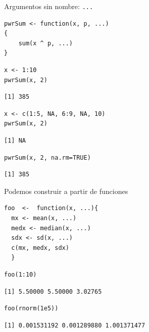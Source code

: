 \documentclass[xcolor={usenames,svgnames,dvipsnames}]{beamer}
\begin{document}
\begin{frame}[fragile,label={sec:org062ccb0}]{Argumentos sin nombre: \texttt{...}}
 \lstset{language=r,label= ,caption= ,captionpos=b,numbers=none}
\begin{lstlisting}
pwrSum <- function(x, p, ...)
{
    sum(x ^ p, ...)
}
\end{lstlisting}

\lstset{language=r,label= ,caption= ,captionpos=b,numbers=none}
\begin{lstlisting}
x <- 1:10
pwrSum(x, 2)
\end{lstlisting}

\begin{verbatim}
[1] 385
\end{verbatim}

\lstset{language=r,label= ,caption= ,captionpos=b,numbers=none}
\begin{lstlisting}
x <- c(1:5, NA, 6:9, NA, 10)
pwrSum(x, 2)
\end{lstlisting}

\begin{verbatim}
[1] NA
\end{verbatim}

\lstset{language=r,label= ,caption= ,captionpos=b,numbers=none}
\begin{lstlisting}
pwrSum(x, 2, na.rm=TRUE)
\end{lstlisting}

\begin{verbatim}
[1] 385
\end{verbatim}
\end{frame}

\begin{frame}[fragile,label={sec:org340ed79}]{Podemos construir a partir de funciones}
 \lstset{language=r,label= ,caption= ,captionpos=b,numbers=none}
\begin{lstlisting}
foo  <-  function(x, ...){
  mx <- mean(x, ...)
  medx <- median(x, ...)
  sdx <- sd(x, ...)
  c(mx, medx, sdx)
  }
\end{lstlisting}

\lstset{language=r,label= ,caption= ,captionpos=b,numbers=none}
\begin{lstlisting}
foo(1:10)
\end{lstlisting}

\begin{verbatim}
[1] 5.50000 5.50000 3.02765
\end{verbatim}

\lstset{language=r,label= ,caption= ,captionpos=b,numbers=none}
\begin{lstlisting}
foo(rnorm(1e5))
\end{lstlisting}

\begin{verbatim}
[1] 0.001531192 0.001289880 1.001371477
\end{verbatim}
\end{frame}
\end{document}

